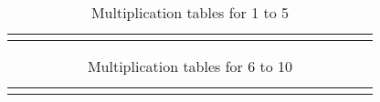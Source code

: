 \documentclass[12pt,a4paper,landscape]{article}
\newcommand{\mymult}[1]{\luadirect{mymult(#1)}}
\begin{document}
\begin{table}[t]
\begin{tabular}{|r c r c r|r c r c r|r c r c r|r c r c r|r c r c r|}\hline
\rowcolor{gray!18}
\mymult{5}
\end{tabular}
\caption*{Multiplication tables for 1 to 5}
\end{table}
\begin{table}[t]
\begin{tabular}{|r c r c r|r c r c r|r c r c r|r c r c r|r c r c r|}\hline
\rowcolor{gray!18}
\mymult{10}
\end{tabular}
\caption*{Multiplication tables for 6 to 10}
\end{table}
\end{document}
